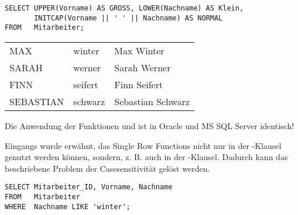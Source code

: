         \begin{lstlisting}[language=oracle_sql,caption={UPPER, LOWER und INITCAP},label=sql03_01]
SELECT UPPER(Vorname) AS GROSS, LOWER(Nachname) AS Klein,
       INITCAP(Vorname || ' ' || Nachname) AS NORMAL
FROM   Mitarbeiter;
        \end{lstlisting}
        \begin{center}
          \begin{small}
            \tablehead{}
            \tabletail {
            }
            \begin{oraclesql}
              \begin{supertabular}{lll}
                MAX & winter & Max Winter \\
                SARAH & werner & Sarah Werner \\
                FINN & seifert & Finn Seifert \\
                SEBASTIAN & schwarz & Sebastian Schwarz \\
              \end{supertabular}
            \end{oraclesql}
          \end{small}
        \end{center}
        \begin{merke}
          Die Anwendung der Funktionen  und  ist in Oracle und MS SQL Server identisch!
        \end{merke}
        Eingangs wurde erw\"ahnt, das Single Row Functions nicht nur in der \SELECT-Klausel genutzt werden k\"onnen, sondern, z. B. auch in der \WHERE-Klausel. Dadurch kann das beschriebene Problem der Casesensitivit\"at gel\"ost werden.
        \begin{lstlisting}[language=oracle_sql,caption={Das Problem der Casesensitivit\"at},label=sql03_02]
SELECT Mitarbeiter_ID, Vorname, Nachname
FROM   Mitarbeiter
WHERE  Nachname LIKE 'winter';
        \end{lstlisting}

